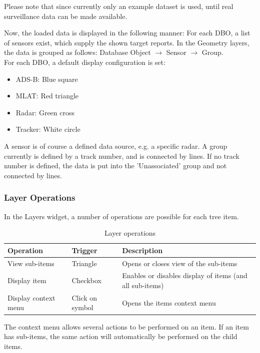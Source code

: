 {Please note that since currently only an example dataset is used, until real surveillance data can be made available.

Now, the loaded data is displayed in the following manner: For each DBO, a list of sensors exist, which supply the shown target reports. In the Geometry layers, the data is grouped as follows: Database Object $\rightarrow$ Sensor $\rightarrow$ Group. \\

For each DBO, a default display configuration is set:

\begin{itemize}
 \item ADS-B: Blue square
 \item MLAT: Red triangle
 \item Radar: Green cross
 \item Tracker: White circle
\end{itemize}

A sensor is of course a defined data source, e.g. a specific radar. A group currently is defined by a track number, and is connected by lines. If no track number is defined, the data is put into the 'Unassociated' group and not connected by lines.

\subsubsection{Layer Operations}

In the Layers widget, a number of operations are possible for each tree item.

\begin{table}[H]
  \center
  \begin{tabular}{ | l | l | l |}
    \hline
    \textbf{Operation} & \textbf{Trigger} &  \textbf{Description} \\ \hline
    View sub-items & Triangle & Opens or closes view of the sub-items \\ \hline
    Display item & Checkbox & Enables or disables display of items (and all sub-items) \\ \hline
    Display context menu & Click on symbol & Opens the items context menu \\ \hline
  \end{tabular}
  \caption{Layer operations}
\end{table}

The context menu allows several actions to be performed on an item. If an item has sub-items, the same action will automatically be performed on the child items.

}
